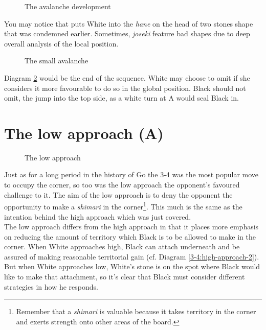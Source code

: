 \documentclass[a5paper,12pt,twoside]{book} %
\newcounter{joseki}                 %
\newcommand{\dref}[1]{Diagram \ref{#1}}
\newcommand{\addstufftotoc}[2][toc]{%
  \addtocontents{#1}{#2}}
\begin{document}
\begin{figure}[!htbp]
 
\vspace{-0.6cm}\caption{The avalanche development}
\label{3-4:avalance-1}
\end{figure}

You may notice that{\large\whitestone[3]} puts White into the \textit{hane} on the head of two stones shape that was condemned earlier. Sometimes, \textit{joseki} feature bad shapes due to deep overall analysis of the local position.\\

\begin{figure}[!htbp]
 
\vspace{-0.6cm}\caption{The small avalanche}
\label{3-4:avalance-2}
\end{figure}

\dref{3-4:avalance-2} would be the end of the sequence. White may choose to omit{\large\whitestone[9]} if she considers it more favourable to do so in the global position. Black should not omit{\large\blackstone[8]}, the jump into the top side, as a white turn at A would seal Black in.\\

\addstufftotoc{\nobreak\smallskip\protect\par}


\section{The low approach (A)}
 
\begin{figure}[!htbp]
 
\vspace{-0.6cm}\caption{The low approach}
\label{3-4:low-dev}
\end{figure}

Just as for a long period in the history of Go the 3-4 was the most popular move to occupy the corner, so too was the low approach the opponent's favoured challenge to it. The aim of the low approach is to deny the opponent the opportunity to make a \textit{shimari} in the corner\footnote{Remember that a \textit{shimari} is valuable because it takes territory in the corner and exerts strength onto other areas of the board.}. This much is the same as the intention behind the high approach which was just covered.\\

The low approach differs from the high approach in that it places more emphasis on reducing the amount of territory which Black is to be allowed to make in the corner. When White approaches high, Black can attach underneath and be assured of making reasonable territorial gain (cf. \dref{3-4:high-approach-2}). But when White approaches low, White's stone is on the spot where Black would like to make that attachment, so it's clear that Black must consider different strategies in how he responds.\\
\end{document}
